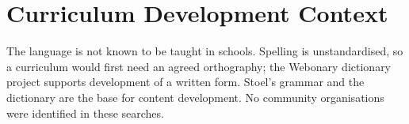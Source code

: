 \documentclass[12pt]{article}
\begin{document}
\section{Curriculum Development Context}
The language is not known to be taught in schools. Spelling is unstandardised, so a curriculum would first need an agreed orthography; the Webonary dictionary project supports development of a written form. Stoel's grammar and the dictionary are the base for content development. No community organisations were identified in these searches.
\end{document}
